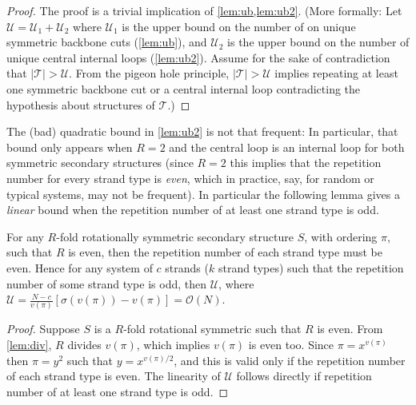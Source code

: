 \begin{proof}
	The proof is a trivial  implication of \cref{lem:ub,lem:ub2}.  
	(More formally: Let $\mathcal{U}= \mathcal{U}_1+\mathcal{U}_2$ where 
	$\mathcal{U}_1$ is the upper bound on the number of on unique symmetric backbone cuts (\cref{lem:ub}),
	and
	$\mathcal{U}_2$ is the upper bound on the number of unique central internal loops (\cref{lem:ub2}). 
	Assume for the sake of contradiction that $ |\mathcal{T}| > \mathcal{U}$. 
	From the pigeon hole principle, $|\mathcal{T}| > \mathcal{U}$ implies repeating at least one symmetric backbone cut or a central internal loop contradicting the hypothesis about structures of $\mathcal{T}$.)
\end{proof}

The (bad) quadratic bound in \cref{lem:ub2} is not that frequent: 
In particular, that bound only appears when $R=2$ and the central loop is an internal loop for both symmetric secondary structures (since $R=2$ this implies that the repetition number for every strand type is {\em even}, which in practice, say, for random or typical systems, may not be frequent).   
In particular the following lemma gives a {\em linear} bound when the repetition number of at least one strand type is odd. 


\begin{lemma} \label{lem:even}
	For any $R$-fold rotationally symmetric  secondary structure $S$, with ordering $\pi$, such that $R$ is even, then the repetition number of each strand type must be even. Hence for any system of $c$ strands ($k$ strand types) such that the repetition number of some strand type is odd, then $\mathcal{U}$, where $\mathcal{U} =  \frac{N-c}{v(\pi)} \left[ \sigma(v(\pi))-v(\pi) \right] = \mathcal{O}(N)$. 
\end{lemma}
\begin{proof}
	Suppose $S$ is a $R$-fold rotational symmetric such that $R$ is even. From \cref{lem:div}, $R$ divides $v(\pi)$, which implies $v(\pi)$ is even too. Since $\pi = x^{v(\pi)}$ then $\pi = y^2$ such that $y= x^{v(\pi)/2}$, and this is valid only if the repetition number of each strand type is even. The linearity of $\mathcal{U}$ follows directly if repetition number of at least one strand type is odd.
\end{proof}




